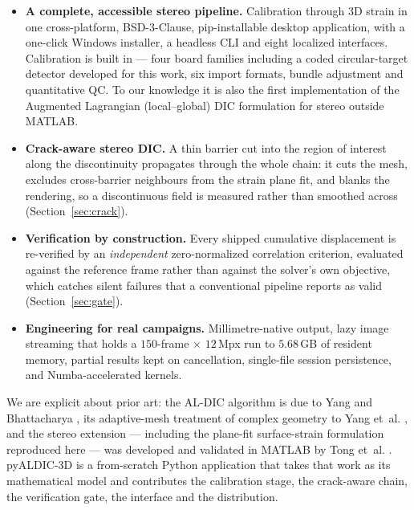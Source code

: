 \begin{itemize}\setlength\itemsep{1pt}
\item[\textbf{(i)}] \textbf{A complete, accessible stereo pipeline.} Calibration through 3D strain in one cross-platform, BSD-3-Clause, pip-installable desktop application, with a one-click Windows installer, a headless CLI and eight localized interfaces. Calibration is built in --- four board families including a coded circular-target detector developed for this work, six import formats, bundle adjustment and quantitative QC. To our knowledge it is also the first implementation of the Augmented Lagrangian (local--global) DIC formulation \cite{yang2019augmented} for stereo outside MATLAB.
\item[\textbf{(ii)}] \textbf{Crack-aware stereo DIC.} A thin barrier cut into the region of interest along the discontinuity propagates through the whole chain: it cuts the mesh, excludes cross-barrier neighbours from the strain plane fit, and blanks the rendering, so a discontinuous field is measured rather than smoothed across (Section~\ref{sec:crack}).
\item[\textbf{(iii)}] \textbf{Verification by construction.} Every shipped cumulative displacement is re-verified by an \emph{independent} zero-normalized correlation criterion, evaluated against the reference frame rather than against the solver's own objective, which catches silent failures that a conventional pipeline reports as valid (Section~\ref{sec:gate}).
\item[\textbf{(iv)}] \textbf{Engineering for real campaigns.} Millimetre-native output, lazy image streaming that holds a $150$-frame $\times$ $12$\,Mpx run to $5.68$\,GB of resident memory, partial results kept on cancellation, single-file session persistence, and Numba-accelerated kernels.
\end{itemize}

We are explicit about prior art: the AL-DIC algorithm is due to Yang and Bhattacharya \cite{yang2019augmented}, its adaptive-mesh treatment of complex geometry to Yang et~al. \cite{yang2022staq}, and the stereo extension --- including the plane-fit surface-strain formulation reproduced here --- was developed and validated in MATLAB by Tong et~al. \cite{tong2025stereo}. pyALDIC-3D is a from-scratch Python application that takes that work as its mathematical model and contributes the calibration stage, the crack-aware chain, the verification gate, the interface and the distribution.

